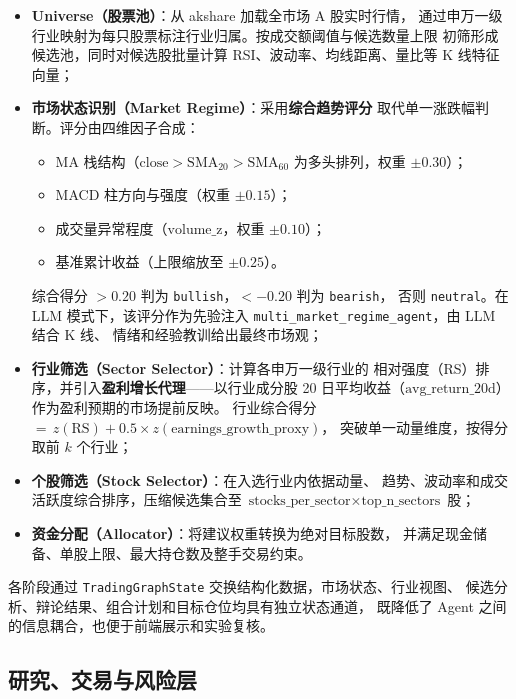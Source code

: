 \documentclass[a4paper,11pt]{article}
\begin{document}
\begin{itemize}
    \item \textbf{Universe（股票池）}：从 akshare 加载全市场 A 股实时行情，
    通过申万一级行业映射为每只股票标注行业归属。按成交额阈值与候选数量上限
    初筛形成候选池，同时对候选股批量计算 RSI、波动率、均线距离、量比等
    K 线特征向量；
    \item \textbf{市场状态识别（Market Regime）}：采用\textbf{综合趋势评分}
    取代单一涨跌幅判断。评分由四维因子合成：
    \begin{itemize}
        \item MA 栈结构（$\text{close}>\text{SMA}_{20}>\text{SMA}_{60}$ 为多头排列，权重 $\pm0.30$）；
        \item MACD 柱方向与强度（权重 $\pm0.15$）；
        \item 成交量异常程度（$\text{volume\_z}$，权重 $\pm0.10$）；
        \item 基准累计收益（上限缩放至 $\pm0.25$）。
    \end{itemize}
    综合得分 $>0.20$ 判为 \texttt{bullish}，$<-0.20$ 判为 \texttt{bearish}，
    否则 \texttt{neutral}。在 LLM 模式下，该评分作为先验注入
    \texttt{multi\_market\_regime\_agent}，由 LLM 结合 K 线、
    情绪和经验教训给出最终市场观；
    \item \textbf{行业筛选（Sector Selector）}：计算各申万一级行业的
    相对强度（RS）排序，并引入\textbf{盈利增长代理}——以行业成分股
    20 日平均收益（$\text{avg\_return\_20d}$）作为盈利预期的市场提前反映。
    行业综合得分 $=\,z(\text{RS}) + 0.5 \times z(\text{earnings\_growth\_proxy})$，
    突破单一动量维度，按得分取前 $k$ 个行业；
    \item \textbf{个股筛选（Stock Selector）}：在入选行业内依据动量、
    趋势、波动率和成交活跃度综合排序，压缩候选集合至
    $\text{stocks\_per\_sector} \times \text{top\_n\_sectors}$ 股；
    \item \textbf{资金分配（Allocator）}：将建议权重转换为绝对目标股数，
    并满足现金储备、单股上限、最大持仓数及整手交易约束。
\end{itemize}

各阶段通过 \texttt{TradingGraphState} 交换结构化数据，市场状态、行业视图、
候选分析、辩论结果、组合计划和目标仓位均具有独立状态通道，
既降低了 Agent 之间的信息耦合，也便于前端展示和实验复核。

\subsection{研究、交易与风险层}
\end{document}
